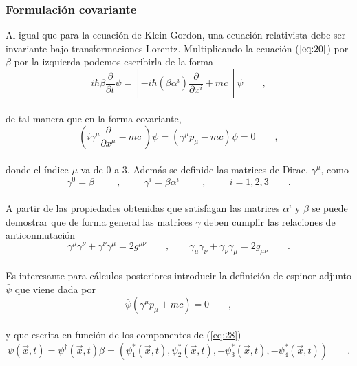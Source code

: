 \documentclass[11pt,letterpaper]{article}     %
\begin{document}
\subsubsection{Formulación covariante} 





Al igual que para la ecuación de Klein-Gordon, una ecuación relativista debe ser invariante bajo transformaciones Lorentz. Multiplicando la ecuación ($\ref{eq:20}$) por $\beta$ por la izquierda podemos escribirla de la forma
\begin{equation} \label{eq:31}
i\hbar \beta \frac{\partial}{\partial t} \psi = \left[- i \hbar (\beta \alpha^i)\frac{\partial}{\partial x^i} + mc \; \right] \psi \qquad ,
\end{equation}
\\de tal manera que en la forma covariante,
\begin{equation} \label{eq:32}
\left( i \gamma^\mu \frac{\partial}{\partial x^\mu} - mc \; \right)\psi = (\gamma^\mu p_\mu - mc)\psi=0 \qquad ,
\end{equation}
\\donde el índice $\mu$ va de 0 a 3. Además se definide las matrices de Dirac, $\gamma^\mu$, como
\begin{equation} \label{eq:33}
\gamma^0= \beta \hspace{1cm} , \hspace{1cm}  \gamma^i=\beta \alpha^i \hspace{1cm} , \hspace{1cm} i=1,2,3\qquad .
\end{equation} \\ 
A partir de las propiedades obtenidas que satisfagan las matrices $\alpha^i$ y $\beta$ se puede demostrar que de forma general las matrices $\gamma$ deben cumplir las relaciones de anticonmutación
\begin{equation} \label{eq:34}
\gamma^\mu \gamma^\nu + \gamma^\nu \gamma^\mu =2g^{\mu \nu} \qquad , \qquad \gamma_\mu \gamma_\nu + \gamma_\nu \gamma_\mu =2g_{\mu \nu} \qquad .
\end{equation} \\
Es interesante para cálculos posteriores introducir la definición de espinor adjunto $\bar{\psi}$ que viene dada por
\begin{equation} \label{eq:35}
\bar{\psi} \left( \gamma^\mu p_\mu + mc\right)=0 \qquad ,
\end{equation}
\\y que escrita en función de los componentes de (\ref{eq:28})
\begin{equation} \label{eq:36}
\bar{\psi} (\vec{x},t)= \psi^\dagger (\vec{x},t) \beta =\left( \psi_1^*(\vec{x},t),\psi_2^*(\vec{x},t),-\psi_3^*(\vec{x},t),-\psi_4^*(\vec{x},t)\right) \qquad .
\end{equation} \\ 
\end{document}
